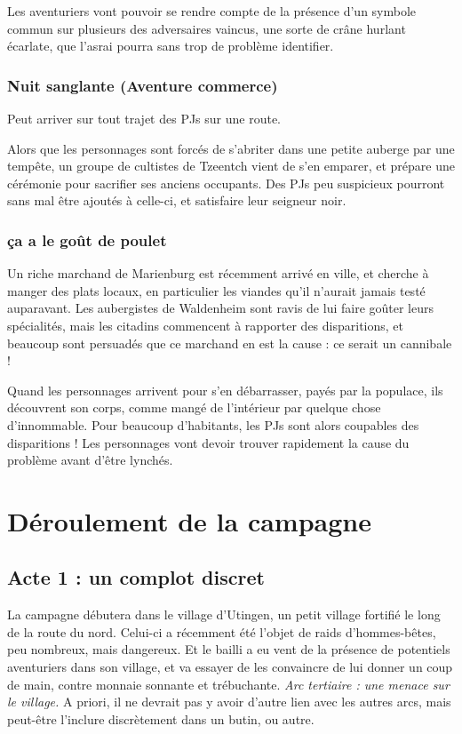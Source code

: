 \documentclass[10pt,a4paper]{book}
\begin{document}
Les aventuriers vont pouvoir se rendre compte de la présence d'un symbole commun sur plusieurs des adversaires vaincus, une sorte de crâne hurlant écarlate, que l'asrai pourra sans trop de problème identifier.
\subsection{Nuit sanglante (Aventure commerce)}
Peut arriver sur tout trajet des PJs sur une route.

Alors que les personnages sont forcés de s'abriter dans une petite auberge par une tempête, un groupe de cultistes de Tzeentch vient de s'en emparer, et prépare une cérémonie pour sacrifier ses anciens occupants. Des PJs peu suspicieux pourront sans mal être ajoutés à celle-ci, et satisfaire leur seigneur noir.
\subsection{ça a le goût de poulet}
Un riche marchand de Marienburg est récemment arrivé en ville, et cherche à manger des plats locaux, en particulier les viandes qu'il n'aurait jamais testé auparavant. Les aubergistes de Waldenheim sont ravis de lui faire goûter leurs spécialités, mais les citadins commencent à rapporter des disparitions, et beaucoup sont persuadés que ce marchand en est la cause : ce serait un cannibale !

Quand les personnages arrivent pour s'en débarrasser, payés par la populace, ils découvrent son corps, comme mangé de l'intérieur par quelque chose d'innommable. Pour beaucoup d'habitants, les PJs sont alors coupables des disparitions ! Les personnages vont devoir trouver rapidement la cause du problème avant d'être lynchés.
\chapter{Déroulement de la campagne}
\section{Acte 1 : un complot discret}
La campagne débutera dans le village d'Utingen, un petit village fortifié le long de la route du nord. Celui-ci a récemment été l'objet de raids d'hommes-bêtes, peu nombreux, mais dangereux. Et le bailli a eu vent de la présence de potentiels aventuriers dans son village, et va essayer de les convaincre de lui donner un coup de main, contre monnaie sonnante et trébuchante. \emph{Arc tertiaire : une menace sur le village.} A priori, il ne devrait pas y avoir d'autre lien avec les autres arcs, mais peut-être l'inclure discrètement dans un butin, ou autre. 
\end{document}

